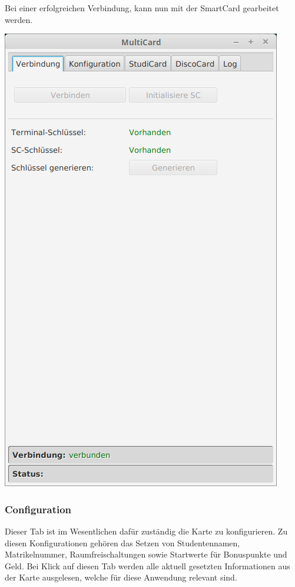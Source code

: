 Bei einer erfolgreichen Verbindung, kann nun mit der SmartCard gearbeitet werden.

\begin{center}
	\includegraphics[scale=0.4]{Images/ConnectionTab}
\end{center}


\subsubsection{Configuration}
Dieser Tab ist im Wesentlichen dafür zuständig die Karte zu konfigurieren.
Zu diesen Konfigurationen gehören das Setzen von Studentennamen, Matrikelnummer, Raumfreischaltungen sowie Startwerte für Bonuspunkte und Geld.
Bei Klick auf diesen Tab werden alle aktuell gesetzten Informationen aus der Karte ausgelesen, welche für diese Anwendung relevant sind.

